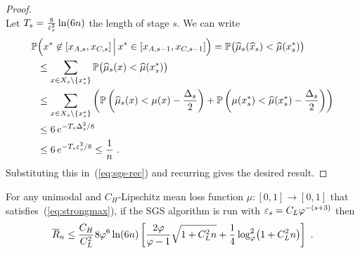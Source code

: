 \begin{proof}
\[\]
Let $T_s = \tfrac{8}{\varepsilon_s^2}\ln(6n)$ the length of stage $s$. We can write
\begin{align*}
    \mathbb{P}&\Bigl(x^* \not\in [x_{A,s},x_{C,s}] \,\Big|\, x^* \in [x_{A,s-1},x_{C,s-1}]\Bigr)
=
    \mathbb{P}\bigl(\widehat{\mu}_s(\widehat{x}_s) < \widehat{\mu}(x^*_s)\bigr)
\\ &\le
    \sum_{x \in X_s\setminus\{x^*_s\}}\mathbb{P}\bigl(\widehat{\mu}_s(x) < \widehat{\mu}(x^*_s)\bigr)
\\ &\le
    \sum_{x \in X_s\setminus\{x^*_s\}}\left( \mathbb{P}\left(\widehat{\mu}_s(x) < \mu(x) - \frac{\Delta_s}{2}\right) + \mathbb{P}\left(\mu(x^*_s) < \widehat{\mu}(x^*_s) - \frac{\Delta_s}{2}\right)\right)
\\ &\le
    6\,e^{-T_s\Delta_s^2/8} 
\\ &\le
    6\,e^{-T_s\varepsilon_s^2/8} 
\le
    \frac{1}{n}~.
\end{align*}
Substituting this in~(\ref{eq:sgs-rec}) and recurring gives the desired result.
\end{proof}
%
\begin{theorem}
For any unimodal and $C_H$-Lipschitz mean loss function $\mu : [0,1] \to [0,1]$ that satisfies~(\ref{eq:strongmax}),
if the SGS algorithm is run with $\varepsilon_s = C_L\varphi^{-(s+3)}$ then
\[
    \overline{R}_n \le \frac{C_H}{C_L^2}8\varphi^6\ln(6n) \left[ \frac{2\varphi}{\varphi-1}\sqrt{1 + C_L^2 n} + \frac{1}{4}\log_{\varphi}^2\bigl(1 + C_L^2 n\bigr) \right]~.
\]
\end{theorem}
%
